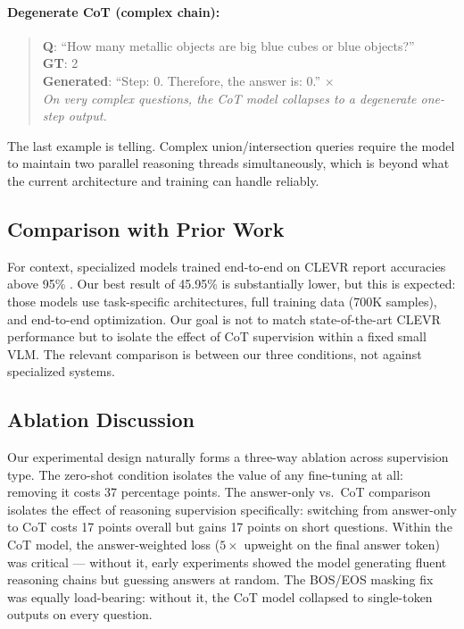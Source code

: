 \documentclass[11pt,twocolumn]{article}
\begin{document}
\paragraph{Degenerate CoT (complex chain):}
\begin{quote}
\small \textbf{Q}: ``How many metallic objects are big blue cubes or blue objects?''\\
\textbf{GT}: 2\\
\textbf{Generated}: ``Step: 0. Therefore, the answer is: 0.'' $\times$\\
\textit{On very complex questions, the CoT model collapses to a degenerate one-step output.}
\end{quote}

The last example is telling. Complex union/intersection queries require the model to maintain two parallel reasoning threads simultaneously, which is beyond what the current architecture and training can handle reliably.

\subsection{Comparison with Prior Work}

For context, specialized models trained end-to-end on CLEVR report accuracies above 95\% \cite{johnson2017clevr}. Our best result of 45.95\% is substantially lower, but this is expected: those models use task-specific architectures, full training data (700K samples), and end-to-end optimization. Our goal is not to match state-of-the-art CLEVR performance but to isolate the effect of CoT supervision within a fixed small VLM. The relevant comparison is between our three conditions, not against specialized systems.

\subsection{Ablation Discussion}

Our experimental design naturally forms a three-way ablation across supervision type. The zero-shot condition isolates the value of any fine-tuning at all: removing it costs 37 percentage points. The answer-only vs.\ CoT comparison isolates the effect of reasoning supervision specifically: switching from answer-only to CoT costs 17 points overall but gains 17 points on short questions. Within the CoT model, the answer-weighted loss ($5\times$ upweight on the final answer token) was critical — without it, early experiments showed the model generating fluent reasoning chains but guessing answers at random. The BOS/EOS masking fix was equally load-bearing: without it, the CoT model collapsed to single-token outputs on every question.
\end{document}

